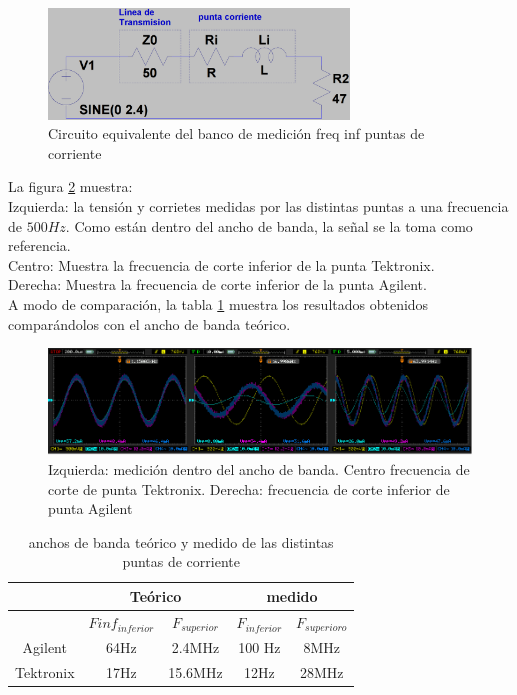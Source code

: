 \documentclass[a4paper,10pt]{article}
\begin{document}
		\begin{figure}[!htb]
			\centering
			\includegraphics[width=8cm]
	 		{Esquematicos/esqPuntaCorriente.png}
			\caption{Circuito equivalente del banco de medición freq inf 
			puntas de corriente}
		    \label{esq003}
		\end{figure}

		\indent La figura \ref{img009} muestra:  \\
		\indent Izquierda: la tensión y corrietes medidas por las distintas 
		puntas a una frecuencia de $500Hz$. Como están dentro del ancho de 
		banda, la señal se la toma como referencia. \\
		\indent Centro: Muestra la frecuencia de corte inferior de la punta 
		Tektronix. \\
		\indent Derecha: Muestra la frecuencia de corte inferior de la punta 
		Agilent.\\
		\indent A modo de comparación, la tabla \ref{tab001} muestra los 
		resultados obtenidos comparándolos con el ancho de banda teórico.
		
		\begin{figure}[!htb]
			\centering
			\includegraphics[width=12cm]
	 		{Imagenes/Mediciones instrumentos/frecCortePuntaCorriente.png}
			\caption{Izquierda: medición dentro del ancho de banda. Centro 
			frecuencia de corte de punta Tektronix. Derecha: frecuencia de corte
			inferior de punta Agilent}
		    \label{img009}
		\end{figure}
	
		\begin{table}
		\begin{tabular}{|c|c|c|c|c|}
			\hline
			 & \multicolumn{2}{|c|}{Teórico} & \multicolumn{2}{|c|}{medido} \\
			\hline
			& $Finf_{inferior}$ & $F_{superior}$ & $F_{inferior}$ & 
			$F_{superioro}$ \\
			\hline
			Agilent & 64Hz  & 2.4MHz  & 100 Hz & 8MHz \\
			\hline
			Tektronix & 17Hz & 15.6MHz  & 12Hz  & 28MHz \\
			\hline
		\end{tabular}
		\caption{anchos de banda teórico y medido de las distintas puntas de 
		corriente }\label{tab001}
		\end{table}
\end{document}
